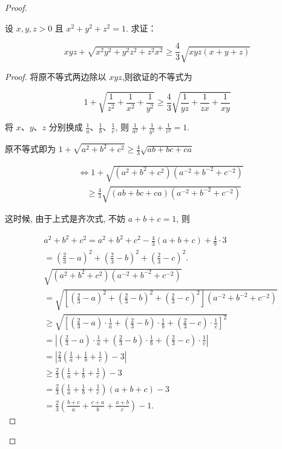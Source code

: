 \begin{proof}
\begin{example}
\begin{example}
	设 $x, y, z>0$ 且 $x^{2}+y^{2}+z^{2}=1$. 求证：
	
	$$
	x y z+\sqrt{x^{2} y^{2}+y^{2} z^{2}+z^{2} x^{2}} \geqslant \frac{4}{3} \sqrt{x y z(x+y+z)}
	$$
\end{example}
\begin{proof}
	将原不等式两边除以 $x y z$,则欲证的不等式为
	
	$$
	1+\sqrt{\frac{1}{z^{2}}+\frac{1}{x^{2}}+\frac{1}{y^{2}}} \geqslant \frac{4}{3} \sqrt{\frac{1}{y z}+\frac{1}{z x}+\frac{1}{x y}}
	$$
	
	将 $x 、 y 、 z$ 分别换成 $\frac{1}{a} 、 \frac{1}{b} 、 \frac{1}{c}$, 则 $\frac{1}{a^{2}}+\frac{1}{b^{2}}+\frac{1}{c^{2}}=1$.
	
	原不等式即为 $1+\sqrt{a^{2}+b^{2}+c^{2}} \geqslant \frac{4}{3} \sqrt{a b+b c+c a}$
	
	$$
	\begin{aligned}
	& \Leftrightarrow 1+\sqrt{\left(a^{2}+b^{2}+c^{2}\right)\left(a^{-2}+b^{-2}+c^{-2}\right)} \\
	& \quad \geqslant \frac{4}{3} \sqrt{(a b+b c+c a)\left(a^{-2}+b^{-2}+c^{-2}\right)}
	\end{aligned}
	$$
	
	这时候, 由于上式是齐次式, 不妨 $a+b+c=1$, 则
	
	$$
	\begin{aligned}
	& a^{2}+b^{2}+c^{2}=a^{2}+b^{2}+c^{2}-\frac{4}{3}(a+b+c)+\frac{4}{9} \cdot 3 \\
	&=\left(\frac{2}{3}-a\right)^{2}+\left(\frac{2}{3}-b\right)^{2}+\left(\frac{2}{3}-c\right)^{2} . \\
	& \sqrt{\left(a^{2}+b^{2}+c^{2}\right)\left(a^{-2}+b^{-2}+c^{-2}\right)} \\
	&= \sqrt{\left[\left(\frac{2}{3}-a\right)^{2}+\left(\frac{2}{3}-b\right)^{2}+\left(\frac{2}{3}-c\right)^{2}\right]\left(a^{-2}+b^{-2}+c^{-2}\right)} \\
	& \geqslant \sqrt{\left[\left(\frac{2}{3}-a\right) \cdot \frac{1}{a}+\left(\frac{2}{3}-b\right) \cdot \frac{1}{b}+\left(\frac{2}{3}-c\right) \cdot \frac{1}{c}\right]^{2}} \\
	&=\left|\left(\frac{2}{3}-a\right) \cdot \frac{1}{a}+\left(\frac{2}{3}-b\right) \cdot \frac{1}{b}+\left(\frac{2}{3}-c\right) \cdot \frac{1}{c}\right| \\
	&=\left|\frac{2}{3}\left(\frac{1}{a}+\frac{1}{b}+\frac{1}{c}\right)-3\right| \\
	& \geqslant \frac{2}{3}\left(\frac{1}{a}+\frac{1}{b}+\frac{1}{c}\right)-3 \\
	&= \frac{2}{3}\left(\frac{1}{a}+\frac{1}{b}+\frac{1}{c}\right)(a+b+c)-3 \\
	&= \frac{2}{3}\left(\frac{b+c}{a}+\frac{c+a}{b}+\frac{a+b}{c}\right)-1 .
	\end{aligned}
	$$
	

\end{proof}
\end{example}
\end{proof}
